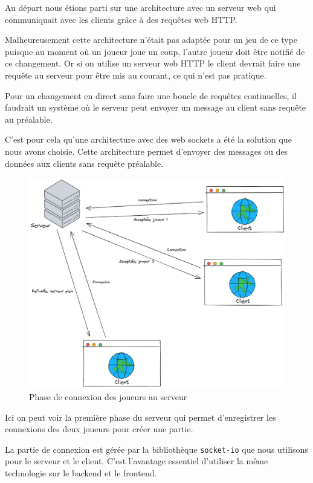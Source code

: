 Au départ nous étions parti sur une architecture avec un serveur web qui communiquait avec les clients grâce à des requêtes web HTTP.

Malheureusement cette architecture n'était pas adaptée pour un jeu de ce type puisque au moment où un joueur joue un coup, l'autre joueur doit être notifié de ce changement. Or si on utilise un serveur web HTTP le client devrait faire une requête au serveur pour être mis au courant, ce qui n'est pas pratique.

Pour un changement en direct sans faire une boucle de requêtes continuelles, il faudrait un système où le serveur peut envoyer un message au client sans requête au préalable.

C'est pour cela qu'une architecture avec des web sockets a été la solution que nous avons choisie.
Cette architecture permet d'envoyer des messages ou des données aux clients sans requête préalable.


\begin{figure}[H]
    \centering
    \includegraphics[scale=0.25]{data/reseau_initialisation.png}
    \caption{Phase de connexion des joueurs au serveur}
\end{figure}

Ici on peut voir la première phase du serveur qui permet d'enregistrer les connexions des deux joueurs pour créer une partie.

La partie de connexion est gérée par la bibliothèque {\tt socket-io} que nous utilisons pour le serveur et le client. C'est l'avantage essentiel d'utiliser la même technologie sur le backend et le frontend.

